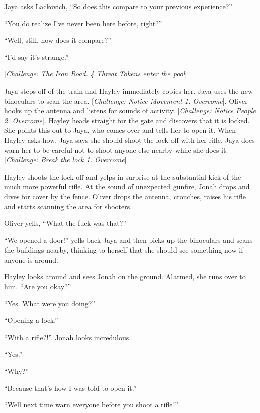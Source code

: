 Jaya asks Lackovich, ``So does this compare to your previous experience?''

``You do realize I've never been here before, right?''

``Well, still, how does it compare?''

``I'd say it's strange.''



{[}\textit{Challenge: The Iron Road.  }\textit{4 Threat Tokens enter the pool}{]}



Jaya steps off of the train and Hayley immediately copies her.  Jaya uses the new binoculars to scan the area. {[}\textit{Challenge: Notice Movement 1.  Overcome}{]}.  Oliver hooks up the antenna and listens for sounds of activity.  {[}\textit{Challenge: Notice People 2.  Overcome}{]}.  Hayley heads straight for the gate and discovers that it is locked.  She points this out to Jaya, who comes over and tells her to open it.  When Hayley asks how, Jaya says she should shoot the lock off with her rifle.  Jaya does warn her to be careful not to shoot anyone else nearby while she does it. {[}\textit{Challenge: Break the lock 1.  Overcome}{]}



Hayley shoots the lock off and yelps in surprise at the substantial kick of the much more powerful rifle.  At the sound of unexpected gunfire, Jonah drops and dives for cover by the fence.  Oliver drops the antenna, crouches, raises his rifle and starts scanning the area for shooters. 



Oliver yells, ``What the fuck was that?''

``We opened a door!'' yells back Jaya and then picks up the binoculars and scans the buildings nearby, thinking to herself that she should see something now if anyone is around.



Hayley looks around and sees Jonah on the ground.  Alarmed, she runs over to him. ``Are you okay?''

``Yes.  What were you doing?''

``Opening a lock.''

``With a rifle?!''.  Jonah looks incredulous.

``Yes.''

``Why?''

``Because that's how I was told to open it.'' 

``Well next time warn everyone before you shoot a rifle!''

